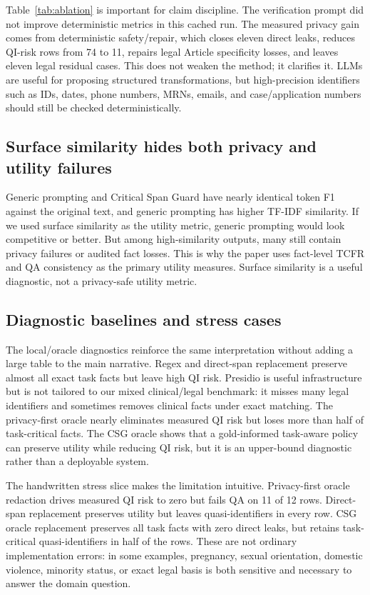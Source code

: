 \documentclass{article}
\newcommand{\method}{Critical Span Guard}
\newcommand{\tcfr}{TCFR}
\begin{document}
Table~\ref{tab:ablation} is important for claim discipline.  The verification
prompt did not improve deterministic metrics in this cached run.  The measured
privacy gain comes from deterministic safety/repair, which closes eleven direct
leaks, reduces QI-risk rows from 74 to 11, repairs legal Article specificity
losses, and leaves eleven legal residual cases.  This does not weaken the method;
it clarifies it.  LLMs are useful for proposing structured transformations, but
high-precision identifiers such as IDs, dates, phone numbers, MRNs, emails, and
case/application numbers should still be checked deterministically.

\subsection{Surface similarity hides both privacy and utility failures}

Generic prompting and \method{} have nearly identical token F1 against the
original text, and generic prompting has higher TF-IDF similarity.  If we used
surface similarity as the utility metric, generic prompting would look
competitive or better.  But among high-similarity outputs, many still contain
privacy failures or audited fact losses.  This is why the paper uses fact-level
\tcfr{} and QA consistency as the primary utility measures.  Surface similarity
is a useful diagnostic, not a privacy-safe utility metric.



\subsection{Diagnostic baselines and stress cases}

The local/oracle diagnostics reinforce the same interpretation without adding a
large table to the main narrative.  Regex and direct-span replacement preserve
almost all exact task facts but leave high QI risk.  Presidio is useful
infrastructure but is not tailored to our mixed clinical/legal benchmark: it
misses many legal identifiers and sometimes removes clinical facts under exact
matching.  The privacy-first oracle nearly eliminates measured QI risk but loses
more than half of task-critical facts.  The CSG oracle shows that a gold-informed
task-aware policy can preserve utility while reducing QI risk, but it is an
upper-bound diagnostic rather than a deployable system.

The handwritten stress slice makes the limitation intuitive.  Privacy-first
oracle redaction drives measured QI risk to zero but fails QA on 11 of 12 rows.
Direct-span replacement preserves utility but leaves quasi-identifiers in every
row.  CSG oracle replacement preserves all task facts with zero direct leaks, but
retains task-critical quasi-identifiers in half of the rows.  These are not
ordinary implementation errors: in some examples, pregnancy, sexual orientation,
domestic violence, minority status, or exact legal basis is both sensitive and
necessary to answer the domain question.
\end{document}
